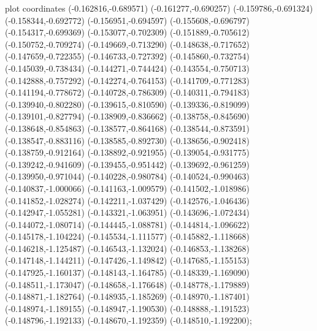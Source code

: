 { plot coordinates {(-0.162816,-0.689571) (-0.161277,-0.690257) (-0.159786,-0.691324) (-0.158344,-0.692772) (-0.156951,-0.694597) (-0.155608,-0.696797) (-0.154317,-0.699369) (-0.153077,-0.702309) (-0.151889,-0.705612) (-0.150752,-0.709274) (-0.149669,-0.713290) (-0.148638,-0.717652) (-0.147659,-0.722355) (-0.146733,-0.727392) (-0.145860,-0.732754) (-0.145039,-0.738434) (-0.144271,-0.744424) (-0.143554,-0.750713) (-0.142888,-0.757292) (-0.142274,-0.764153) (-0.141709,-0.771283) (-0.141194,-0.778672) (-0.140728,-0.786309) (-0.140311,-0.794183) (-0.139940,-0.802280) (-0.139615,-0.810590) (-0.139336,-0.819099) (-0.139101,-0.827794) (-0.138909,-0.836662) (-0.138758,-0.845690) (-0.138648,-0.854863) (-0.138577,-0.864168) (-0.138544,-0.873591) (-0.138547,-0.883116) (-0.138585,-0.892730) (-0.138656,-0.902418) (-0.138759,-0.912164) (-0.138892,-0.921955) (-0.139054,-0.931775) (-0.139242,-0.941609) (-0.139455,-0.951442) (-0.139692,-0.961259) (-0.139950,-0.971044) (-0.140228,-0.980784) (-0.140524,-0.990463) (-0.140837,-1.000066) (-0.141163,-1.009579) (-0.141502,-1.018986) (-0.141852,-1.028274) (-0.142211,-1.037429) (-0.142576,-1.046436) (-0.142947,-1.055281) (-0.143321,-1.063951) (-0.143696,-1.072434) (-0.144072,-1.080714) (-0.144445,-1.088781) (-0.144814,-1.096622) (-0.145178,-1.104224) (-0.145534,-1.111577) (-0.145882,-1.118668) (-0.146218,-1.125487) (-0.146543,-1.132024) (-0.146853,-1.138268) (-0.147148,-1.144211) (-0.147426,-1.149842) (-0.147685,-1.155153) (-0.147925,-1.160137) (-0.148143,-1.164785) (-0.148339,-1.169090) (-0.148511,-1.173047) (-0.148658,-1.176648) (-0.148778,-1.179889) (-0.148871,-1.182764) (-0.148935,-1.185269) (-0.148970,-1.187401) (-0.148974,-1.189155) (-0.148947,-1.190530) (-0.148888,-1.191523) (-0.148796,-1.192133) (-0.148670,-1.192359) (-0.148510,-1.192200)};
}
